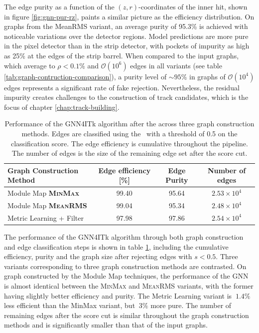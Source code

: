 The edge purity as a function of the $(z,r)$-coordinates of the inner hit, shown in figure \ref{fig:gnn-pur-rz}, paints a similar picture as the efficiency distribution.
On graphs from the MeanRMS variant, an average purity of 95.3\% is achieved with noticeable variations over the detector regions.
Model predictions are more pure in the pixel detector than in the strip detector, with pockets of impurity as high as 25\% at the edges of the strip barrel. 
When compared to the input graphs, which average to $\rho <0.1\%$ and $\mathcal{O}(10^6)$ edges in all variants (see table \ref{tab:graph-contruction-comparison}), a purity level of $\sim 95\%$ in graphs of $\mathcal{O}(10^4)$ edges represents a significant rate of fake rejection. 
Nevertheless, the residual impurity creates challenges to the construction of track candidates, which is the focus of chapter \ref{chap:track-building}.

\begin{table}[h!]
    \centering
    \begin{tabular}{l|c|c|c}
      Graph Construction Method  & Edge efficiency [\%] & Edge Purity & Number of edges  \\
      \hline \hline
        Module Map \textbf{\textsc{MinMax}} & 99.40 & 95.64 & $2.53\times 10^4$ \\
        Module Map \textbf{\textsc{MeanRMS}} & 99.04  & 95.34 & $2.48\times 10^4$ \\
        Metric Learning + Filter & 97.98  & 97.86 & $2.54\times 10^4$\\
        \hline
    \end{tabular}
    \caption{Performance of the GNN4ITk algorithm after the across three graph construction methods. Edges are classified using the \ignn~with a threshold of 0.5 on the classification 
    score. The edge efficiency is cumulative throughout the pipeline. The number of edges is the size of the remaining edge set after the score cut.}
    \label{tab:edge-classification-comparison}
\end{table}

The performance of the GNN4ITk algorithm through both graph construction and edge classification steps is shown in table \ref{tab:edge-classification-comparison}, including 
the cumulative efficiency, purity and the graph size after rejecting edges with $s<0.5$.
Three variants corresponding to three graph construction methods are contrasted.
On graph constructed by the Module Map techniques, the performance of the GNN is almost identical between the \textsc{MinMax} and \textsc{MeanRMS} variants, with the 
former having slightly better efficiency and purity.
The Metric Learning variant is $~1.4\%$ less efficient than the MinMax variant, but $~3\%$ more pure.
The number of remaining edges after the score cut is similar throughout the graph construction methods and is significantly smaller than that of the 
input graphs. 

